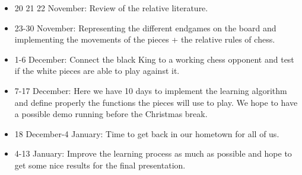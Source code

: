 \documentclass[a4paper,hidelinks]{article}
\begin{document}
\begin{itemize}
\item  20 21 22 November: Review of the relative literature. 
\item 23-30 November: Representing the different endgames on the board and implementing  the movements of the pieces + the relative rules of chess.    
\item 1-6 December: Connect the black King to a working chess opponent and test if the white pieces are able to play against it.
\item 7-17 December: Here we have 10 days to implement the learning algorithm and define properly the functions the pieces will use to play. We hope to have a possible demo running before the Christmas break.   
\item 18 December-4 January: Time to get back in our hometown for all of us. 
\item 4-13 January: Improve the learning process as much as possible and hope to get some nice results for the final presentation.

\end{itemize}
\end{document}
